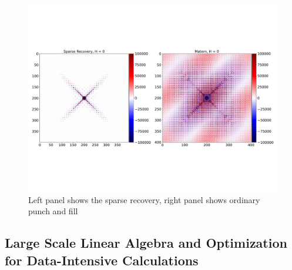 \documentclass[final,onefignum,onetabnum]{siamart190516}
\begin{document}
\begin{figure}
\includegraphics[width=\textwidth, trim=0in 4in 0in 4in 0in]{MaternVsSparse.pdf}
\caption{\label{fig:VO2} Left panel shows the sparse recovery, right panel shows ordinary punch and fill}
\end{figure}

\subsection{Large Scale Linear Algebra and Optimization for Data-Intensive Calculations}

\end{document}
